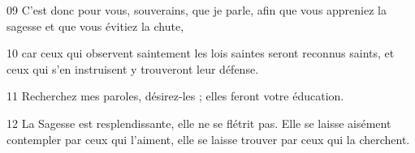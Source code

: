 09 C’est donc pour vous, souverains, que je parle, afin que vous appreniez la sagesse et que vous évitiez la chute,

10 car ceux qui observent saintement les lois saintes seront reconnus saints, et ceux qui s’en instruisent y trouveront leur défense.

11 Recherchez mes paroles, désirez-les ; elles feront votre éducation.

12 La Sagesse est resplendissante, elle ne se flétrit pas. Elle se laisse aisément contempler par ceux qui l’aiment, elle se laisse trouver par ceux qui la cherchent.
